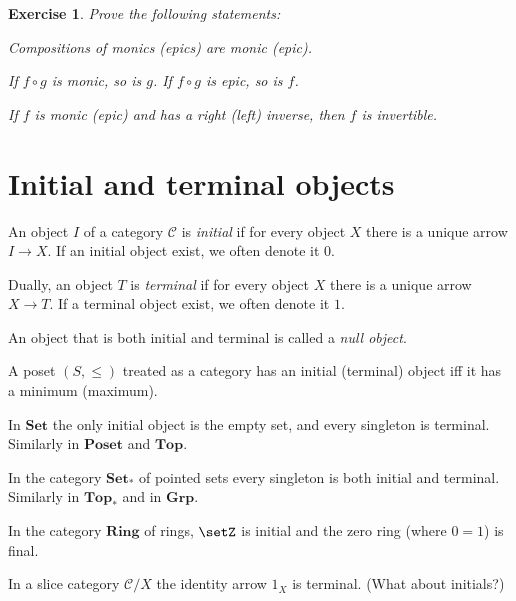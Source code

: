 \documentclass[article, a4paper, 11pt, oneside]{memoir}
\numberwithin{equation}{chapter}
\newcommand{\cat}[1]{\mathcal{#1}}
\newcommand{\ncat}[1]{\mathbf{#1}} %
\newcommand{\catSet}{\ncat{Set}}
\newcommand{\catTop}{\ncat{Top}}
\newcommand{\catGrp}{\ncat{Grp}}
\newcommand{\catRing}{\ncat{Ring}}
\newcommand{\catPoset}{\ncat{Poset}}
\newcommand{\catC}{\cat{C}}
\theoremstyle{myexample}
\newtheorem{exercise}[theorem]{Exercise}
\theoremstyle{myexamplebreak}
\begin{document}
\begin{exercise}
    Prove the following statements:
    \begin{enumexercise}
        \item Compositions of monics (epics) are monic (epic).
        
        \item \label{ex:composition_monic_epic} If $f \circ g$ is monic, so is $g$. If $f \circ g$ is epic, so is $f$.

        \item If $f$ is monic (epic) and has a right (left) inverse, then $f$ is invertible.
    \end{enumexercise}
\end{exercise}




\chapter{Initial and terminal objects}

\newcommand{\arr}[1]{\vec{#1}}

\begin{definition}
    An object $I$ of a category $\catC$ is \emph{initial} if for every object $X$ there is a unique arrow $I \to X$. If an initial object exist, we often denote it $0$.

    Dually, an object $T$ is \emph{terminal} if for every object $X$ there is a unique arrow $X \to T$. If a terminal object exist, we often denote it $1$.

    An object that is both initial and terminal is called a \emph{null object}.
\end{definition}


\begin{examplebreak}
    \begin{enumexample}
        \item A poset $(S, \leq)$ treated as a category has an initial (terminal) object iff it has a minimum (maximum).
        
        \item In $\catSet$ the only initial object is the empty set, and every singleton is terminal. Similarly in $\catPoset$ and $\catTop$.
        
        \item In the category $\catSet_*$ of pointed sets every singleton is both initial and terminal. Similarly in $\catTop_*$ and in $\catGrp$.
        
        \item In the category $\catRing$ of rings, $\setZ$ is initial and the zero ring (where $0 = 1$) is final.
        
        \item In a slice category $\catC/X$ the identity arrow $1_X$ is terminal. (What about initials?)
    \end{enumexample}
\end{examplebreak}
\end{document}
